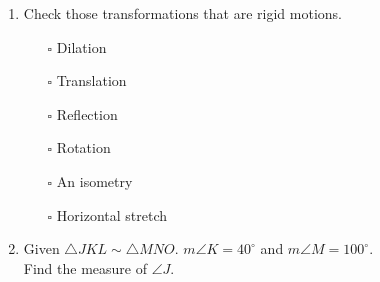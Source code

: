 \documentclass[12pt, twoside]{article}
\begin{document}
\begin{enumerate}
    \item Check those transformations that are rigid motions.
    \begin{itemize}
      \item[$\square$] Dilation
      \item[$\square$] Translation
      \item[$\square$] Reflection
      \item[$\square$] Rotation
      \item[$\square$] An isometry
      \item[$\square$] Horizontal stretch
    \end{itemize}


  \item Given $\triangle JKL \sim \triangle MNO$. $m\angle K = 40^\circ$ and $m\angle M = 100^\circ$.\\
    Find the measure of $\angle J$. \vspace{3cm}



\end{enumerate}
\end{document}
